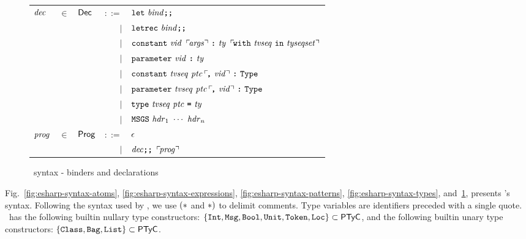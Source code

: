 \documentclass[final]{article}
\begin{document}
\begin{figure}[t]
\begin{small}
\begin{center}
\begin{tabular}{lllrl}
    $\mathit{dec}$
    & $\in$
    & $\mathsf{Dec}$
    & $::=$
    & $\mathtt{let}\ \mathit{bind}\textbf{\texttt{;}}\textbf{\texttt{;}}$
    \\
    &&& $\mid$
    & $\mathtt{letrec}\ \mathit{bind}\textbf{\texttt{;}}\textbf{\texttt{;}}$
    \\
    &&& $\mid$
    & $\mathtt{constant}\ \mathit{vid}\ \,\ulcorner\!\mathit{args}\urcorner\ \textbf{\texttt{:}}\ \mathit{ty}\ \,\ulcorner\!\mathtt{with}\ \mathit{tvseq}\ \mathtt{in}\ \mathit{tyseqset}\urcorner$
    \\
    &&& $\mid$
    & $\mathtt{parameter}\ \mathit{vid}\ \textbf{\texttt{:}}\ \mathit{ty}$
    \\
    &&& $\mid$
    & $\mathtt{constant}\ \mathit{tvseq}\ \mathit{ptc}\,\ulcorner\!\textbf{\texttt{,}}\ \mathit{vid}\urcorner\ \textbf{\texttt{:}}\ \mathtt{Type}$
    \\
    &&& $\mid$
    & $\mathtt{parameter}\ \mathit{tvseq}\ \mathit{ptc}\,\ulcorner\!\textbf{\texttt{,}}\ \mathit{vid}\urcorner\ \textbf{\texttt{:}}\ \mathtt{Type}$
    \\
    &&& $\mid$
    & $\mathtt{type}\ \mathit{tvseq}\ \mathit{ptc}\ \textbf{\texttt{=}}\ \mathit{ty}$
    \\
    &&& $\mid$
    & $\mathtt{MSGS}\ \mathit{hdr}_1\ \cdots\ \mathit{hdr}_n$
    \\

    $\mathit{prog}$
    & $\in$
    & $\mathsf{Prog}$
    & $::=$
    & $\epsilon$
    \\
    &&& $\mid$
    & $\mathit{dec}\textbf{\texttt{;}}\textbf{\texttt{;}}\ \,\ulcorner\!\mathit{prog}\urcorner$
  \end{tabular}
\end{center}
\caption{\eml\ syntax - binders and declarations}
\label{fig:esharp-syntax-declarations}
\end{small}
\end{figure}


Fig.~\ref{fig:esharp-syntax-atoms},
\ref{fig:esharp-syntax-expressions},
\ref{fig:esharp-syntax-patterns},
\ref{fig:esharp-syntax-types},
and~\ref{fig:esharp-syntax-declarations}, presents \eml's syntax.
Following the syntax used by \SML, we use $\mathtt{(*}$ and $\mathtt{*)}$
to delimit comments.
%
Type variables are identifiers preceded with a single quote.
%
\eml\ has the following builtin nullary type constructors:
$\{\mathtt{Int},\mathtt{Msg},\mathtt{Bool},\mathtt{Unit},\mathtt{Token},\mathtt{Loc}\}
\subset\mathsf{PTyC}$, and the following builtin unary type constructors:
$\{\mathtt{Class},\mathtt{Bag},\mathtt{List}\}\subset\mathsf{PTyC}$.

\end{document}
